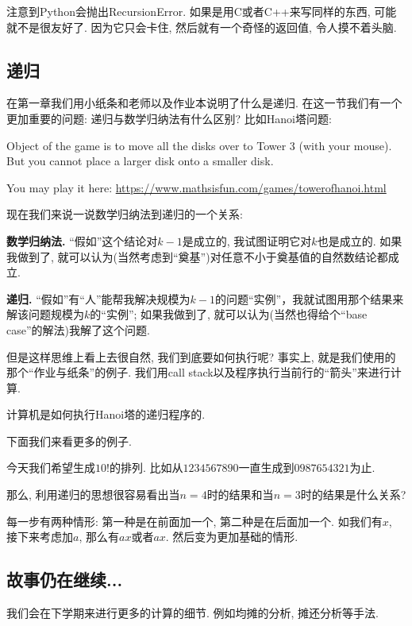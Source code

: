 注意到Python会抛出RecursionError. 如果是用C或者C++来写同样的东西, 可能就不是很友好了. 因为它只会卡住, 然后就有一个奇怪的返回值, 令人摸不着头脑. 

\subsection*{递归}

在第一章我们用小纸条和老师以及作业本说明了什么是递归. 在这一节我们有一个更加重要的问题: 递归与数学归纳法有什么区别? 比如Hanoi塔问题: 


\begin{prob}[Hanoi塔问题]
	Object of the game is to move all the disks over to Tower 3 (with your mouse). But you cannot place a larger disk onto a smaller disk.
	
	You may play it here: \url{https://www.mathsisfun.com/games/towerofhanoi.html}
\end{prob}

现在我们来说一说数学归纳法到递归的一个关系: 

\textbf{数学归纳法. } ``假如''这个结论对$k-1$是成立的, 我试图证明它对$k$也是成立的. 
如果我做到了, 就可以认为(当然考虑到``奠基'')对任意不小于奠基值的自然数结论都成立. 

\textbf{递归. }``假如''有``人''能帮我解决规模为$k-1$的问题``实例''，我就试图用那个结果来解该问题规模为$k$的``实例''; 如果我做到了, 就可以认为(当然也得给个“base case”的解法)我解了这个问题. 

但是这样思维上看上去很自然, 我们到底要如何执行呢? 事实上, 就是我们使用的那个``作业与纸条''的例子. 我们用call stack以及程序执行当前行的``箭头''来进行计算. 

\begin{example}
	计算机是如何执行Hanoi塔的递归程序的. 
\end{example}

下面我们来看更多的例子. 

 今天我们希望生成$10!$的排列. 比如从$1234567890$一直生成到$0987654321$为止. 

那么, 利用递归的思想很容易看出当$n=4$时的结果和当$n=3$时的结果是什么关系? 

每一步有两种情形: 第一种是在前面加一个, 第二种是在后面加一个. 如我们有$x$, 接下来考虑加$a$, 那么有$ax$或者$ax$. 然后变为更加基础的情形. 

\subsection*{故事仍在继续...}

我们会在下学期来进行更多的计算的细节. 例如均摊的分析, 摊还分析等手法. 



















